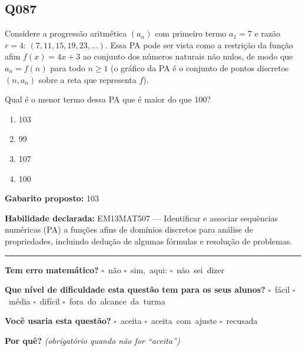 \documentclass[11pt,a4paper]{article}
\begin{document}
\begin{samepage}
\subsection*{Q087}
Considere a progressão aritmética $(a_n)$ com primeiro termo $a_1 = 7$ e razão $r = 4$: $(7, 11, 15, 19, 23, \dots)$. Essa PA pode ser vista como a restrição da função afim $f(x) = 4x + 3$ ao conjunto dos números naturais não nulos, de modo que $a_n = f(n)$ para todo $n \geq 1$ (o gráfico da PA é o conjunto de pontos discretos $(n, a_n)$ sobre a reta que representa $f$).

Qual é o menor termo dessa PA que é maior do que 100?
\begin{enumerate}[label=(\alph*),nosep,leftmargin=*]
\item 103
\item 99
\item 107
\item 100
\end{enumerate}

\textbf{Gabarito proposto:} 103

\textbf{Habilidade declarada:} EM13MAT507 --- Identificar e associar sequências numéricas (PA) a funções afins de domínios discretos para análise de propriedades, incluindo dedução de algumas fórmulas e resolução de problemas.
\end{samepage}

\noindent\rule{\linewidth}{0.4pt}
\textbf{Tem erro matemático?}\quad
\mbox{$\square$~não} \quad \mbox{$\square$~sim, aqui:} \underline{\hspace{5cm}}
\quad \mbox{$\square$~não sei dizer}

\textbf{Que nível de dificuldade esta questão tem para os seus alunos?}\quad
\mbox{$\square$~fácil} \quad \mbox{$\square$~média} \quad
\mbox{$\square$~difícil} \quad \mbox{$\square$~fora do alcance da turma}

\textbf{Você usaria esta questão?}\quad
\mbox{$\square$~aceita} \quad \mbox{$\square$~aceita com ajuste} \quad
\mbox{$\square$~recusada}

\textbf{Por quê?} \emph{(obrigatório quando não for ``aceita'')}

\underline{\hspace{\linewidth}}

\underline{\hspace{\linewidth}}
\vspace{0.6em}
\end{document}
